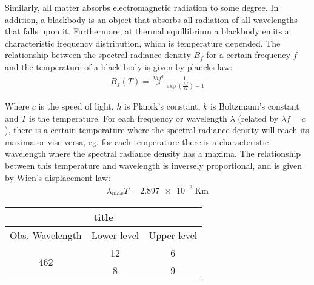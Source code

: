 Similarly, all matter absorbs electromagnetic radiation to some degree. In addition, a blackbody is an object that absorbs all radiation of all wavelengths that falls upon it. Furthermore, at thermal equillibrium a blackbody emits a characteristic frequency distribution, which is temperature depended. The relationship between the spectral radiance density $B_f$ for a certain frequency $f$ and the temperature of a black body is given by plancks law:
%
\begin{align}
B_{f}(T)= \frac{2hf^3}{c^2}\frac{1}{\exp(\frac{hf}{kT})-1}
\label{planck}
\end{align}

Where $c$ is the speed of light, $h$ is Planck's constant, $k$ is Boltzmann's
constant and $T$ is the temperature. For each frequency or wavelength $\lambda$
(related by $\lambda f = c$), there is a certain temperature where the spectral
radiance density will reach its maxima or vise versa, eg. for each temperature
there is a characteristic wavelength where the spectral radiance density has a maxima. The relationship between this temperature and wavelength is inversely proportional, and is given by Wien's displacement law:
%
\begin{align}
\lambda_{max}T=\SI{2.897 e-3}{\kelvin \meter}
\label{eq:wien}
\end{align}

\begin{table}[h]
	\begin{tabular}[h]{ccc}
		\toprule
		\multicolumn{3}{c}{title}\\
		\midrule
		Obs. Wavelength & Lower level & Upper level  \\
		\multirow{2}{*}{462} & 12  & 6 \\
		 & 8 & 9 \\
		\bottomrule
	\end{tabular}
\end{table}
